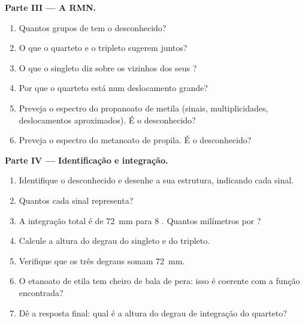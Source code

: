 \begin{problem}
\medskip
\noindent\textbf{Parte III --- A RMN.}
\begin{enumerate}[resume]
  \item Quantos grupos de  tem o desconhecido?
  \item O que o quarteto e o tripleto sugerem juntos?
  \item O que o singleto diz sobre os vizinhos dos seus ?
  \item Por que o quarteto está num deslocamento grande?
  \item Preveja o espectro do propanoato de metila
         (sinais, multiplicidades, deslocamentos
        aproximados). É o desconhecido?
  \item Preveja o espectro do metanoato de propila. É o desconhecido?
\end{enumerate}

\medskip
\noindent\textbf{Parte IV --- Identificação e integração.}
\begin{enumerate}[resume]
  \item Identifique o desconhecido e desenhe a sua estrutura, indicando
        cada sinal.
  \item Quantos  cada sinal representa?
  \item A integração total é de \qty{72}{mm} para 8 . Quantos
        milímetros por ?
  \item Calcule a altura do degrau do singleto e do tripleto.
  \item Verifique que os três degraus somam \qty{72}{mm}.
  \item O etanoato de etila tem cheiro de bala de pera: isso é coerente
        com a função encontrada?
  \item Dê a resposta final: qual é a altura do degrau de integração do
        quarteto?
\end{enumerate}
\end{problem}
